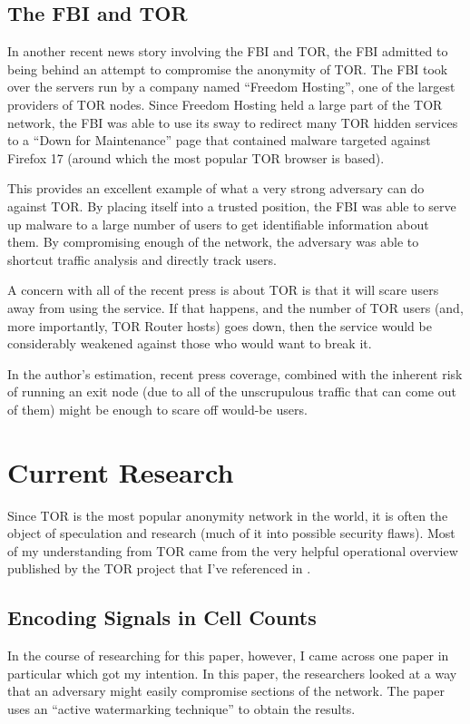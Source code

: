\documentclass[letterpaper, titlepage, 12pt]{article}
\begin{document}
\subsection{The FBI and TOR}
In another recent news story involving the FBI and TOR, the FBI admitted to being behind an attempt to compromise the anonymity of TOR\cite{freedom}. The FBI took over the servers run by a company named ``Freedom Hosting'', one of the largest providers of TOR nodes. Since Freedom Hosting held a large part of the TOR network, the FBI was able to use its sway to redirect many TOR hidden services to a ``Down for Maintenance\cite{freedom}'' page that contained malware targeted against Firefox 17 (around which the most popular TOR browser is based).

This provides an excellent example of what a very strong adversary can do against TOR. By placing itself into a trusted position, the FBI was able to serve up malware to a large number of users to get identifiable information about them. By compromising enough of the network, the adversary was able to shortcut traffic analysis and directly track users.

A concern with all of the recent press is about TOR is that it will scare users away from using the service. If that happens, and the number of TOR users (and, more importantly, TOR Router hosts) goes down, then the service would be considerably weakened against those who would want to break it.

In the author's estimation, recent press coverage, combined with the inherent risk of running an exit node (due to all of the unscrupulous traffic that can come out of them) might be enough to scare off would-be users.

\section{Current Research}
Since TOR is the most popular anonymity network in the world, it is often the object of speculation and research (much of it into possible security flaws). Most of my understanding from TOR came from the very helpful operational overview published by the TOR project that I've referenced in \cite{whitepaper}. 

\subsection{Encoding Signals in Cell Counts}
In the course of researching for this paper, however, I came across one paper in particular which got my intention. In this paper\cite{6132443}, the researchers looked at a way that an adversary might easily compromise sections of the network. The paper uses an ``active watermarking technique'' to obtain the results.
\end{document}
